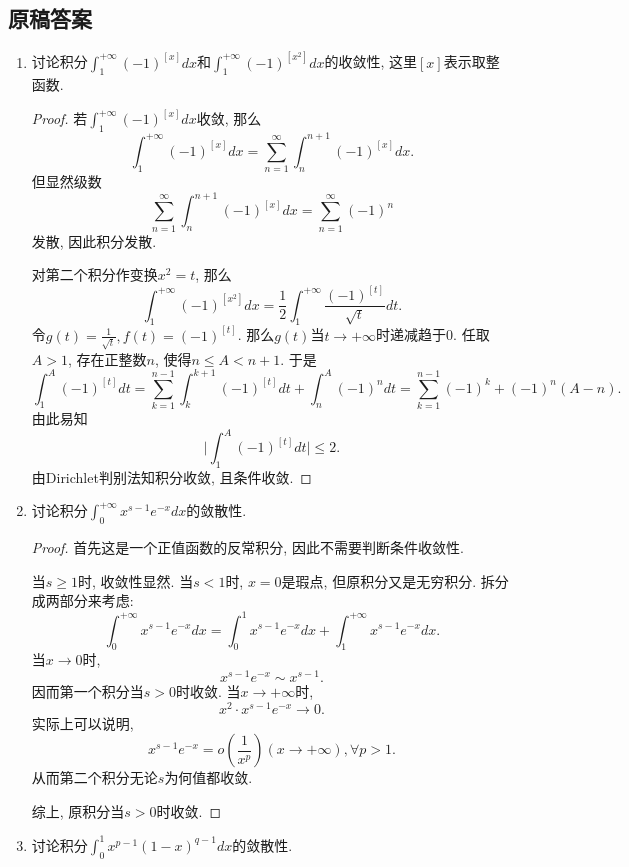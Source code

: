 \documentclass[UTF8,11pt, a4paper, oneside, fontset=none]{ctexbook}
\begin{document}
\clearpage

\subsection*{原稿答案}

\begin{enumerate}
\item 讨论积分$\int_1^{+\infty} (-1)^{[x]} dx$和$\int_1^{+\infty} (-1)^{[x^2]} dx$的收敛性, 这里$[x]$表示取整函数.


\begin{proof}

若$\int_1^{+\infty} (-1)^{[x]} dx$收敛, 那么
\[
\int_1^{+\infty} (-1)^{[x]} dx = \sum_{n=1}^{\infty} \int_n^{n+1} (-1)^{[x]} dx.
\]
但显然级数
\[
\sum_{n=1}^{\infty} \int_n^{n+1} (-1)^{[x]} dx = \sum_{n=1}^{\infty} (-1)^n
\]
发散, 因此积分发散.


对第二个积分作变换$x^2 = t$, 那么
\[
\int_1^{+\infty} (-1)^{[x^2]} dx = \frac{1}{2} \int_1^{+\infty} \frac{(-1)^{[t]}}{\sqrt t} dt.
\]
令$g(t) = \frac{1}{\sqrt t}, f(t) = (-1)^{[t]}$. 那么$g(t)$当$t \to +\infty$时递减趋于0. 任取$A>1$, 存在正整数$n$, 使得$n \leq A < n+1$. 于是
\[
\int_1^A (-1)^{[t]} dt = \sum_{k=1}^{n-1} \int_k^{k+1}  (-1)^{[t]} dt + \int_n^A  (-1)^{n} dt = \sum_{k=1}^{n-1} (-1)^k + (-1)^n (A-n).
\]
由此易知
\[
\Big| \int_1^A (-1)^{[t]} dt \Big| \leq 2.
\]
由Dirichlet判别法知积分收敛, 且条件收敛.
\end{proof}


\item 讨论积分$\int_0^{+\infty} x^{s-1} e^{-x}dx$的敛散性.


\begin{proof}


首先这是一个正值函数的反常积分, 因此不需要判断条件收敛性.


当$s \geq 1$时, 收敛性显然. 当$s < 1$时, $x = 0$是瑕点, 但原积分又是无穷积分. 拆分成两部分来考虑:
\[
\int_0^{+\infty} x^{s-1} e^{-x}dx = \int_0^{1} x^{s-1} e^{-x}dx + \int_1^{+\infty} x^{s-1} e^{-x}dx.
\]
当$x \to 0$时,
\[
x^{s-1} e^{-x} \sim x^{s-1}.
\]
因而第一个积分当$s > 0$时收敛. 当$x \to +\infty$时,
\[
x^2 \cdot x^{s-1} e^{-x} \to 0.
\]
实际上可以说明,
\[
x^{s-1} e^{-x}  = o \left( \frac{1}{x^p} \right) (x \to +\infty), \forall p > 1.
\]
从而第二个积分无论$s$为何值都收敛.

综上, 原积分当$s > 0$时收敛.

\end{proof}




\item 讨论积分$\int_0^1 x^{p-1} (1-x)^{q-1} dx$的敛散性.



\end{enumerate}
\end{document}
